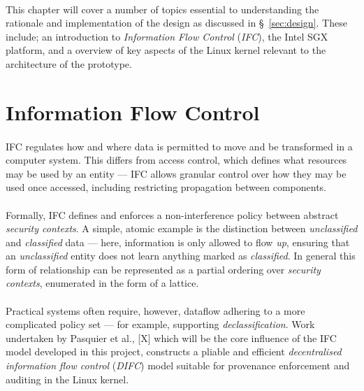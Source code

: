 
\paragraph{} This chapter will cover a number of topics essential to understanding the rationale and implementation of the design as discussed in §~\ref{sec:design}. These include; an introduction to \textit{Information Flow Control} (\textit{IFC}), the Intel SGX platform, and a overview of key aspects of the Linux kernel relevant to the architecture of the prototype.



\section{Information Flow Control}

\paragraph{} IFC regulates how and where data is permitted to move and be transformed in a computer system. This differs from access control, which defines what resources may be used by an entity --- IFC allows granular control over how they may be used once accessed, including restricting propagation between components. 

\paragraph{} Formally, IFC defines and enforces a non-interference policy between abstract \textit{security contexts}. A simple, atomic example is the distinction between \textit{unclassified} and \textit{classified} data --- here, information is only allowed to flow \textit{up}, ensuring that an \textit{unclassified} entity does not learn anything marked as \textit{classified}. In general this form of relationship can be represented as a partial ordering over \textit{security contexts}, enumerated in the form of a lattice.

\paragraph{} Practical systems often require, however, dataflow adhering to a more complicated policy set --- for example, supporting \textit{declassification}. Work undertaken by Pasquier et al., [X] which will be the core influence of the IFC model developed in this project, constructs a pliable and efficient \textit{decentralised information flow control} (\textit{DIFC}) model suitable for provenance enforcement and auditing in the Linux kernel.

